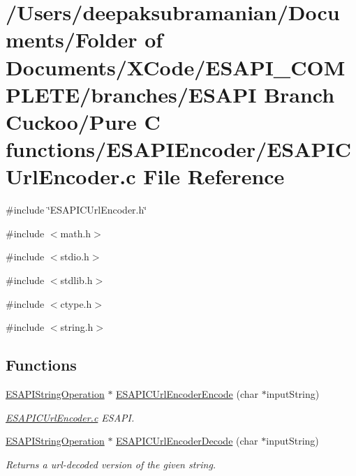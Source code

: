 \hypertarget{a00023}{
\section{/Users/deepaksubramanian/Documents/Folder of Documents/XCode/ESAPI\_\-COMPLETE/branches/ESAPI Branch Cuckoo/Pure C functions/ESAPIEncoder/ESAPICUrlEncoder.c File Reference}
\label{d3/d52/a00023}
}
{\ttfamily \#include \char`\"{}ESAPICUrlEncoder.h\char`\"{}}\par
{\ttfamily \#include $<$math.h$>$}\par
{\ttfamily \#include $<$stdio.h$>$}\par
{\ttfamily \#include $<$stdlib.h$>$}\par
{\ttfamily \#include $<$ctype.h$>$}\par
{\ttfamily \#include $<$string.h$>$}\par
\subsection*{Functions}
\begin{DoxyCompactItemize}
\item 
\hyperlink{a00002}{ESAPIStringOperation} $\ast$ \hyperlink{a00023_a70680314259b6234f6ec145fe7e14d05}{ESAPICUrlEncoderEncode} (char $\ast$inputString)
\begin{DoxyCompactList}\small\item\em \hyperlink{a00023}{ESAPICUrlEncoder.c} ESAPI. \end{DoxyCompactList}\item 
\hyperlink{a00002}{ESAPIStringOperation} $\ast$ \hyperlink{a00023_a77844763f8628b07716dcbb830aba544}{ESAPICUrlEncoderDecode} (char $\ast$inputString)
\begin{DoxyCompactList}\small\item\em Returns a url-\/decoded version of the given string. \end{DoxyCompactList}\end{DoxyCompactItemize}


